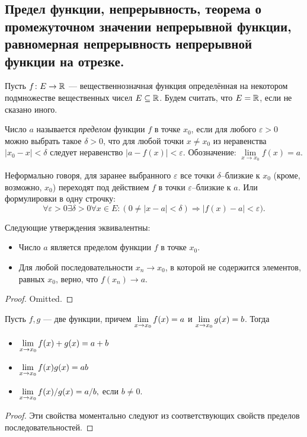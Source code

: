 \subsection{ Предел функции, непрерывность, теорема о промежуточном значении непрерывной функции, равномерная непрерывность непрерывной функции на отрезке.}
Пусть \(f\colon E\to\mathbb{R}\) --- вещественнозначная функция определённая на некотором подмножестве вещественных чисел \(E\subseteq \mathbb{R}\). Будем считать, что \(E=\mathbb{R}\), если не сказано иного.
\begin{defin}
	Число \(a\) называется \textit{пределом} функции \(f\) в точке \(x_0\), если для любого \(\varepsilon>0\) можно выбрать такое \(\delta>0\), что для любой точки \(x\neq x_0\) из неравенства \(|x_0-x|<\delta\) следует неравенство \(|a - f(x)| < \varepsilon\). Обозначение: \(\lim\limits_{x\to x_0}f(x)=a\).
\end{defin}
Неформально говоря, для заранее выбранного \(\varepsilon\) все точки \(\delta\)--близкие к \(x_0\) (кроме, возможно, \(x_0\)) переходят под действием \(f\) в точки \(\varepsilon\)--близкие к \(a\).
Или формулировки в одну строчку:
\[\forall \varepsilon>0\exists\delta>0\forall x\in E : (0\neq|x-a|<\delta) \Rightarrow |f(x) - a|<\varepsilon).\]

\begin{proposition}
	Следующие утверждения эквивалентны:
	\begin{itemize}
		\item Число \(a\) является пределом функции \(f\) в точке \(x_0\).
		\item Для любой последовательности \(x_n\to x_0\), в которой не содержится элементов, равных \(x_0\), верно, что \(f(x_n)\to a\).
	\end{itemize}
\end{proposition}

\begin{proof}
	Omitted.
\end{proof}

\begin{proposition}
	Пусть \(f, g\) --- две функции, причем \(\lim\limits_{x\to x_0}f(x) \hm=a\) и \(\lim\limits_{x\to x_0}g(x)\hm=b\).
	Тогда
	\begin{itemize}
		\item \(\lim\limits_{x\to x_0}f(x)+g(x) \hm=a+b\)
		
		\item \(\lim\limits_{x\to x_0}f(x)g(x) \hm=ab\)
		
		\item \(\lim\limits_{x\to x_0}f(x)/g(x) \hm=a/b,\) если \(b\neq0.\)
	\end{itemize}
\end{proposition}
\begin{proof}
	Эти свойства моментально следуют из соответствующих свойств пределов последовательностей.
\end{proof}

